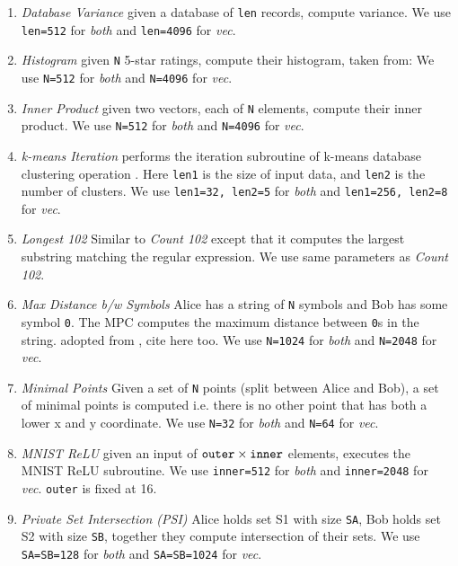 \begin{enumerate}
    \item {\em Database Variance} given a database of {\tt len} records, compute variance.  We use {\tt len=512} for {\em both} and {\tt len=4096} for {\em vec}.
    
    \item {\em Histogram} given {\tt N} 5-star ratings, compute their histogram, taken from:  We use {\tt N=512} for {\em both} and {\tt N=4096} for {\em vec}.

    \item {\em Inner Product} given two vectors, each of {\tt N} elements, compute their inner product. We use {\tt N=512} for {\em both} and {\tt N=4096} for {\em vec}.

    \item {\em k-means Iteration} performs the iteration subroutine of k-means database clustering operation \cite{https://dl.acm.org/doi/10.1145/1081870.1081942, https://dl.acm.org/doi/10.1145/956750.956776}. Here {\tt len1} is the size of input data, and {\tt len2} is the number of clusters. We use {\tt len1=32, len2=5} for {\em both} and {\tt len1=256, len2=8} for {\em vec}. 
    
    \item {\em Longest 102} Similar to {\em Count 102} except that it computes the largest substring matching the regular expression. We use same parameters as {\em Count 102}.
    
    \item {\em Max Distance b/w Symbols} Alice has a string of {\tt N} symbols and Bob has some symbol {\tt 0}. The MPC computes the maximum distance between {\tt 0}s in the string. adopted from {\ishaq, cite here too}. We use {\tt N=1024} for {\em both} and {\tt N=2048} for {\em vec}.
    
    \item {\em Minimal Points} Given a set of {\tt N} points (split between Alice and Bob), a set of minimal points is computed i.e. there is no other point that has both a lower x and y coordinate. We use {\tt N=32} for {\em both} and {\tt N=64} for {\em vec}.
    
    \item {\em MNIST ReLU} given an input of ${\tt outer}\times{\tt inner}$ elements, executes the MNIST ReLU subroutine. We use {\tt inner=512} for {\em both} and {\tt inner=2048} for {\em vec}. {\tt outer} is fixed at 16. 
    
    \item {\em Private Set Intersection (PSI)} Alice holds set S1 with size {\tt SA}, Bob holds set S2 with size {\tt SB}, together they compute intersection of their sets. We use {\tt SA=SB=128} for {\em both} and {\tt SA=SB=1024} for {\em vec}.
\end{enumerate}


